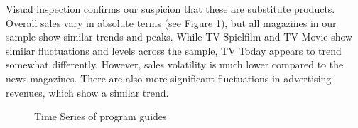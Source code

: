 \documentclass[12pt,a4paper,notitlepage]{article}
\begin{document}
Visual inspection confirms our suspicion that these are substitute products. Overall sales vary in absolute terms (see Figure \ref{fig_tv}), but all magazines in our sample show similar trends and peaks. While TV Spielfilm and TV Movie show similar fluctuations and levels across the sample, TV Today appears to trend somewhat differently. However, sales volatility is much lower compared to the news magazines. There are also more significant fluctuations in advertising revenues, which show a similar trend.  


\begin{figure}[H]\centering
\caption{Time Series of program guides}
	\label{fig_tv}
\end{figure}
\end{document}
